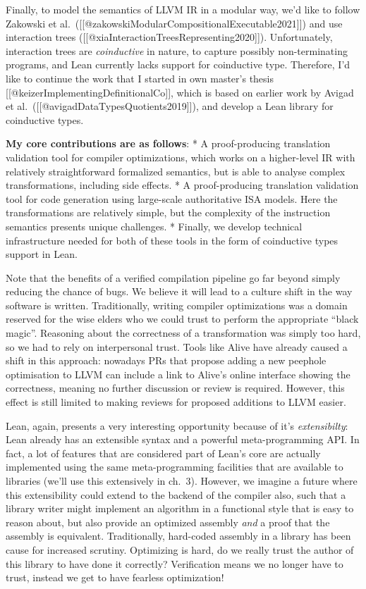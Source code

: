 Finally, to model the semantics of LLVM IR in a modular way, we'd like
to follow Zakowski et
al.~({[}{[}@zakowskiModularCompositionalExecutable2021{]}{]}) and use
interaction trees ({[}{[}@xiaInteractionTreesRepresenting2020{]}{]}).
Unfortunately, interaction trees are \emph{coinductive} in nature, to
capture possibly non-terminating programs, and Lean currently lacks
support for coinductive type. Therefore, I'd like to continue the work
that I started in own master's thesis
{[}{[}@keizerImplementingDefinitionalCo{]}{]}, which is based on earlier
work by Avigad et al.~({[}{[}@avigadDataTypesQuotients2019{]}{]}), and
develop a Lean library for coinductive types.

\textbf{My core contributions are as follows}: * A proof-producing
translation validation tool for compiler optimizations, which works on a
higher-level IR with relatively straightforward formalized semantics,
but is able to analyse complex transformations, including side effects.
* A proof-producing translation validation tool for code generation
using large-scale authoritative ISA models. Here the transformations are
relatively simple, but the complexity of the instruction semantics
presents unique challenges. * Finally, we develop technical
infrastructure needed for both of these tools in the form of coinductive
types support in Lean.

Note that the benefits of a verified compilation pipeline go far beyond
simply reducing the chance of bugs. We believe it will lead to a culture
shift in the way software is written. Traditionally, writing compiler
optimizations was a domain reserved for the wise elders who we could
trust to perform the appropriate ``black magic''. Reasoning about the
correctness of a transformation was simply too hard, so we had to rely
on interpersonal trust. Tools like Alive have already caused a shift in
this approach: nowadays PRs that propose adding a new peephole
optimisation to LLVM can include a link to Alive's online interface
showing the correctness, meaning no further discussion or review is
required. However, this effect is still limited to making reviews for
proposed additions to LLVM easier.

Lean, again, presents a very interesting opportunity because of it's
\emph{extensibilty}: Lean already has an extensible syntax and a
powerful meta-programming API. In fact, a lot of features that are
considered part of Lean's core are actually implemented using the same
meta-programming facilities that are available to libraries (we'll use
this extensively in ch.~3). However, we imagine a future where this
extensibility could extend to the backend of the compiler also, such
that a library writer might implement an algorithm in a functional style
that is easy to reason about, but also provide an optimized assembly
\emph{and} a proof that the assembly is equivalent. Traditionally,
hard-coded assembly in a library has been cause for increased scrutiny.
Optimizing is hard, do we really trust the author of this library to
have done it correctly? Verification means we no longer have to trust,
instead we get to have fearless optimization!

